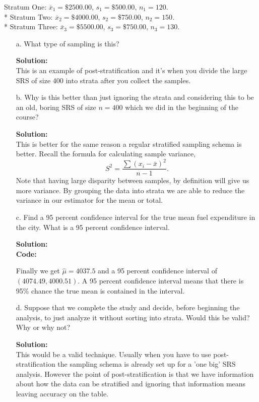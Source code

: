 \documentclass[12pt]{article}
\makeatletter
\theoremstyle{homework}
\newenvironment{exercise}[1]
{\def\@currentlabel{#1}\exercisecore}
{\endexercisecore}
\newcommand{\localhead}[1]{\par\smallskip\noindent\textbf{#1}\nobreak\\}%
\newcommand\solution{\localhead{Solution:}}
\makeatother
\begin{document}
\begin{exercise}{3}
    \noindent* Stratum One: $\overline{x}_1 = \$2500.00$, $s_1 = \$500.00$, $n_1 = 120$.\\
    * Stratum Two: $\overline{x}_2 = \$4000.00$, $s_2 = \$750.00$, $n_2 = 150$.\\
    * Stratum Three: $\overline{x}_3 = \$5500.00$, $s_3 = \$750.00$, $n_3 = 130$.
    \begin{enumerate}
        \item[a.] What type of sampling is this?\\
        \solution This is an example of post-stratification and it's when you divide the large SRS of size 400 into 
        strata after you collect the samples.\\
        \vspace{.15in}
        \item[b.] Why is this better than just ignoring the strata and considering this to be 
        an old, boring SRS of size $n = 400$ which we did in the beginning of the course?\\
        \solution This is better for the same reason a regular stratified sampling schema is better. Recall the formula for 
        calculating sample variance, 
        \begin{equation*}
            S^2 = \dfrac{\sum(x_i - \bar{x})^2}{n-1}.
        \end{equation*} 
        Note that having large disparity between samples, by definition will give us more variance. By grouping the data into strata we are able to reduce the variance in our estimator for the mean or 
        total. 
        \vspace{.15in}
        \item[c.] Find a 95 percent confidence interval for the true mean fuel expenditure in 
        the city. What is a 95 percent confidence interval.\\
        \solution
        \textbf{Code:}
        \begin{center}
        
        \end{center}
        Finally we get $\hat{\mu} = 4037.5$ and a 95 percent confidence interval of $(4074.49, 4000.51)$. A 95 percent 
        confidence interval means that there is 95\% chance the true mean is contained in the interval. 
        \vspace{.15in}
        \item[d.] Suppose that we complete the study and decide, before beginning the analysis, to just analyze it without 
        sorting into strata. Would this be valid? Why or why not?\\
        \solution This would be a valid technique. Usually when you have to use post-stratification the sampling schema is already set 
        up for a 'one big' SRS analysis. However the point of post-stratification is that we have information about how the data can be stratified
        and ignoring that information means leaving accuracy on the table.
    \end{enumerate}
\end{exercise}
\newpage
\end{document}
